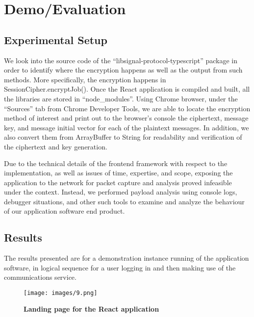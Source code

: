 \documentclass[12pt]{article}
\begin{document}
\newpage
\section{Demo/Evaluation}
\subsection{Experimental Setup}
We look into the source code of the “libsignal-protocol-typescript” package in order to identify where the encryption happens as well as the output from such methods. More specifically, the encryption happens in SessionCipher.encryptJob(). Once the React application is compiled and built, all the libraries are stored in “node\_modules”. Using Chrome browser, under the “Sources” tab from Chrome Developer Tools, we are able to locate the encryption method of interest and print out to the browser’s console the ciphertext, message key, and message initial vector for each of the plaintext messages. In addition, we also convert them from ArrayBuffer to String for readability and verification of the ciphertext and key generation.

\par Due to the technical details of the frontend framework with respect to the implementation, as well as issues of time, expertise, and scope, exposing the application to the network for packet capture and analysis proved infeasible under the context. Instead, we performed payload analysis using console logs, debugger situations, and other such tools to examine and analyze the behaviour of our application software end product.


\subsection{Results}
The results presented are for a demonstration instance running of the application software, in logical sequence for a user logging in and then making use of the communications service.
\begin{figure}[h!]
    \centering
    \texttt{[image: images/9.png]}
    \caption{\textbf{Landing page for the React application}}
    \label{fig:my_label3}
\end{figure}
\end{document}
